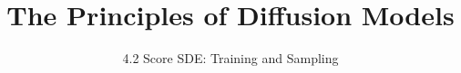 
\title{The Principles of Diffusion Models}
\subtitle{4.2 Score SDE: Training and Sampling}


\begin{frame}
    \titlepage
\end{frame}


